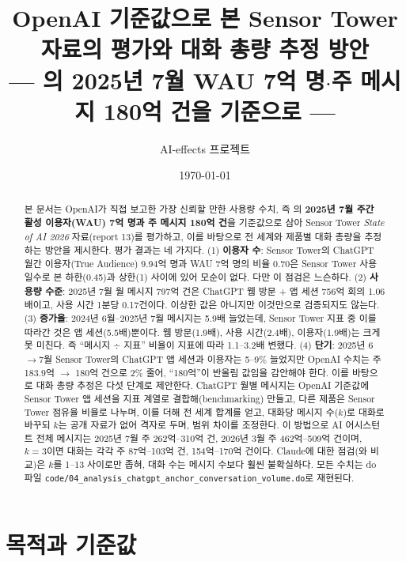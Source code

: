 \documentclass[11pt]{article}
\title{OpenAI 기준값으로 본 Sensor Tower 자료의 평가와 대화 총량 추정 방안\\[2mm]
\large --- \citeauthor{chatterji-2025-how-people-use-chatgpt}의 2025년 7월 WAU 7억 명$\cdot$주 메시지 180억 건을 기준으로 ---}
\author{AI-effects 프로젝트}
\date{\today}
\begin{document}
\maketitle

\begin{abstract}
\noindent 본 문서는 OpenAI가 직접 보고한 가장 신뢰할 만한 사용량 수치, 즉 \textcite{chatterji-2025-how-people-use-chatgpt}의 \textbf{2025년 7월 주간 활성 이용자(WAU) 7억 명과 주 메시지 180억 건}을 기준값으로 삼아 Sensor Tower \textit{State of AI 2026}\parencite{sensortower-2026-state-of-ai} 자료(report 13)를 평가하고, 이를 바탕으로 전 세계와 제품별 대화 총량을 추정하는 방안을 제시한다. 평가 결과는 네 가지다. (1) \textbf{이용자 수}: Sensor Tower의 ChatGPT 월간 이용자(True Audience) 9.94억 명과 WAU 7억 명의 비율 0.70은 Sensor Tower 사용 일수로 본 하한(0.45)과 상한(1) 사이에 있어 모순이 없다. 다만 이 점검은 느슨하다. (2) \textbf{사용량 수준}: 2025년 7월 월 메시지 797억 건은 ChatGPT 웹 방문 + 앱 세션 756억 회의 1.06배이고, 사용 시간 1분당 0.17건이다. 이상한 값은 아니지만 이것만으로 검증되지도 않는다. (3) \textbf{증가율}: 2024년 6월--2025년 7월 메시지는 5.9배 늘었는데, Sensor Tower 지표 중 이를 따라간 것은 앱 세션(5.5배)뿐이다. 웹 방문(1.9배), 사용 시간(2.4배), 이용자(1.9배)는 크게 못 미친다. 즉 ``메시지 $\div$ 지표'' 비율이 지표에 따라 1.1--3.2배 변했다. (4) \textbf{단기}: 2025년 6$\to$7월 Sensor Tower의 ChatGPT 앱 세션과 이용자는 5--9\% 늘었지만 OpenAI 수치는 주 183.9억 $\to$ 180억 건으로 2\% 줄어, ``180억''이 반올림 값임을 감안해야 한다. 이를 바탕으로 대화 총량 추정은 다섯 단계로 제안한다. \① ChatGPT 월별 메시지는 OpenAI 기준값에 Sensor Tower 앱 세션을 지표 계열로 결합해(benchmarking) 만들고, \② 다른 제품은 Sensor Tower 점유율 비율로 나누며, \③ 이를 더해 전 세계 합계를 얻고, \④ 대화당 메시지 수($k$)로 대화로 바꾸되 $k$는 공개 자료가 없어 격자로 두며, \⑤ 범위 차이를 조정한다. 이 방법으로 AI 어시스턴트 전체 메시지는 2025년 7월 주 262억--310억 건, 2026년 3월 주 462억--509억 건이며, $k = 3$이면 대화는 각각 주 87억--103억 건, 154억--170억 건이다. Claude에 대한 점검(\textcite{fan-2026-aggregate-gains-from-ai}와 비교)은 $k$를 1--13 사이로만 좁혀, 대화 수는 메시지 수보다 훨씬 불확실하다. 모든 수치는 do 파일 \texttt{code/04\_analysis\_chatgpt\_anchor\_conversation\_volume.do}로 재현된다.
\end{abstract}

\tableofcontents

\section{목적과 기준값}
\end{document}
